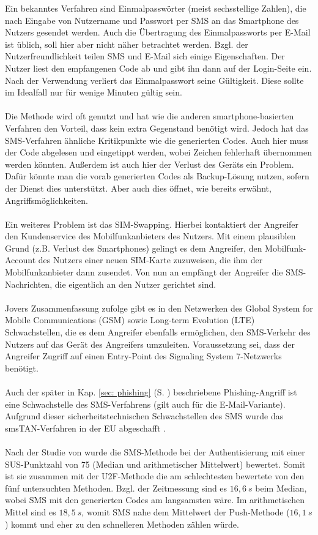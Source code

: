 Ein bekanntes Verfahren sind Einmalpasswörter (meist sechsstellige Zahlen), die nach 
Eingabe von Nutzername und Passwort per SMS an das Smartphone des Nutzers gesendet 
werden. Auch die Übertragung des Einmalpassworts per E-Mail ist üblich, soll hier 
aber nicht näher betrachtet werden. Bzgl. der Nutzerfreundlichkeit teilen SMS und 
E-Mail sich einige Eigenschaften. Der Nutzer liest den empfangenen Code ab und gibt 
ihn dann auf der Login-Seite ein. Nach der Verwendung verliert das Einmalpasswort 
seine Gültigkeit. Diese sollte im Idealfall nur für wenige Minuten gültig sein.
\\\\
Die Methode wird oft genutzt und hat wie die anderen smartphone-basierten Verfahren 
den Vorteil, dass kein extra Gegenstand benötigt wird. Jedoch hat das SMS-Verfahren 
ähnliche Kritikpunkte wie die generierten Codes. Auch hier muss der Code abgelesen 
und eingetippt werden, wobei Zeichen fehlerhaft übernommen werden könnten. Außerdem 
ist auch hier der Verlust des Geräts ein Problem. Dafür könnte man die vorab 
generierten Codes als Backup-Lösung nutzen, sofern der Dienst dies unterstützt. Aber 
auch dies öffnet, wie bereits erwähnt, Angriffsmöglichkeiten.
\\\\
Ein weiteres Problem ist das SIM-Swapping. Hierbei kontaktiert der Angreifer den 
Kundenservice des Mobilfunkanbieters des Nutzers. Mit einem plausiblen Grund (z.B. 
Verlust des Smartphones) gelingt es dem Angreifer, den Mobilfunk-Account des Nutzers 
einer neuen SIM-Karte zuzuweisen, die ihm der Mobilfunkanbieter dann zusendet. Von 
nun an empfängt der Angreifer die SMS-Nachrichten, die eigentlich an den Nutzer 
gerichtet sind. \autocite[51 \psq]{Jover}
\\\\
Jovers Zusammenfassung zufolge gibt es in den Netzwerken des Global System for 
Mobile Communications (GSM) sowie Long-term Evolution (LTE) Schwachstellen, die es 
dem Angreifer ebenfalls ermöglichen, den SMS-Verkehr des Nutzers auf das Gerät des 
Angreifers umzuleiten. Voraussetzung sei, dass der Angreifer Zugriff auf einen 
Entry-Point des \glqq Signaling System 7\grqq{}-Netzwerks benötigt. \autocite[51]{Jover}
\\\\
Auch der später in Kap. \ref{sec: phishing} (S. \pageref{sec: phishing}) beschriebene Phishing-Angriff ist eine Schwachstelle des 
SMS-Verfahrens (gilt auch für die E-Mail-Variante). Aufgrund dieser sicherheitstechnischen Schwachstellen des SMS wurde das smsTAN-Verfahren in der EU abgeschafft \autocite{BSIsmsTan}.
\\\\
Nach der Studie von \textcite{Reese} wurde die SMS-Methode bei der Authentisierung 
mit einer SUS-Punktzahl von 75 (Median und arithmetischer Mittelwert) bewertet. Somit ist sie zusammen mit der U2F-Methode die am schlechtesten 
bewertete von den fünf untersuchten Methoden. Bzgl. der Zeitmessung sind es $16{,}6~s$ 
beim Median, wobei SMS mit den generierten Codes am langsamsten wäre. Im arithmetischen Mittel sind es $18{,}5~s$, womit SMS nahe dem Mittelwert der 
Push-Methode ($16{,}1~s$) kommt und eher zu den schnelleren Methoden zählen würde.
